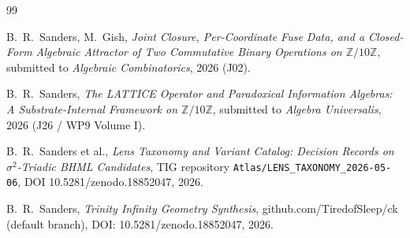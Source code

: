 \documentclass[11pt,reqno]{amsart}
\theoremstyle{plain}
\theoremstyle{definition}
\theoremstyle{remark}
\newcommand{\Z}{\mathbb{Z}}
\newcommand{\sig}{\sigma}
\begin{document}
\begin{thebibliography}{99}

 B.~R.~Sanders, M.~Gish,
\emph{Joint Closure, Per-Coordinate Fuse Data, and a Closed-Form
Algebraic Attractor of Two Commutative Binary Operations on
$\Z/10\Z$}, submitted to \emph{Algebraic Combinatorics}, 2026 (J02).

 B.~R.~Sanders,
\emph{The LATTICE Operator and Paradoxical Information Algebras: A
Substrate-Internal Framework on $\Z/10\Z$}, submitted to
\emph{Algebra Universalis}, 2026 (J26 / WP9 Volume I).

 B.~R.~Sanders et al.,
\emph{Lens Taxonomy and Variant Catalog: Decision Records on
$\sig^{2}$-Triadic BHML Candidates},
TIG repository \texttt{Atlas/LENS\_TAXONOMY\_2026-05-06},
DOI 10.5281/zenodo.18852047, 2026.

 B.~R.~Sanders,
\emph{Trinity Infinity Geometry Synthesis},
github.com/TiredofSleep/ck (default branch),
DOI: 10.5281/zenodo.18852047, 2026.

\end{thebibliography}
\end{document}
